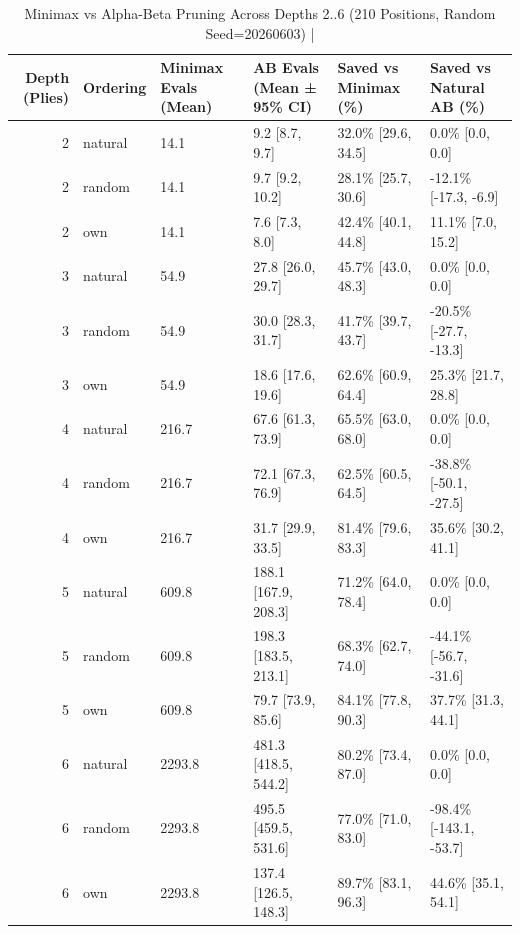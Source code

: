 \begin{table}[htbp]
\centering
\caption{Minimax vs Alpha-Beta Pruning Across Depths 2..6 (210 Positions, Random Seed=20260603) | \stampline}
\label{tab:partC_pruning}
\begin{tabular}{rlllll}
\toprule
Depth (Plies) & Ordering & Minimax Evals (Mean) & AB Evals (Mean ± 95\% CI) & Saved vs Minimax (\%) & Saved vs Natural AB (\%) \\
\midrule
2 & natural & 14.1 & 9.2 [8.7, 9.7] & 32.0\% [29.6, 34.5] & 0.0\% [0.0, 0.0] \\
2 & random & 14.1 & 9.7 [9.2, 10.2] & 28.1\% [25.7, 30.6] & -12.1\% [-17.3, -6.9] \\
2 & own & 14.1 & 7.6 [7.3, 8.0] & 42.4\% [40.1, 44.8] & 11.1\% [7.0, 15.2] \\
3 & natural & 54.9 & 27.8 [26.0, 29.7] & 45.7\% [43.0, 48.3] & 0.0\% [0.0, 0.0] \\
3 & random & 54.9 & 30.0 [28.3, 31.7] & 41.7\% [39.7, 43.7] & -20.5\% [-27.7, -13.3] \\
3 & own & 54.9 & 18.6 [17.6, 19.6] & 62.6\% [60.9, 64.4] & 25.3\% [21.7, 28.8] \\
4 & natural & 216.7 & 67.6 [61.3, 73.9] & 65.5\% [63.0, 68.0] & 0.0\% [0.0, 0.0] \\
4 & random & 216.7 & 72.1 [67.3, 76.9] & 62.5\% [60.5, 64.5] & -38.8\% [-50.1, -27.5] \\
4 & own & 216.7 & 31.7 [29.9, 33.5] & 81.4\% [79.6, 83.3] & 35.6\% [30.2, 41.1] \\
5 & natural & 609.8 & 188.1 [167.9, 208.3] & 71.2\% [64.0, 78.4] & 0.0\% [0.0, 0.0] \\
5 & random & 609.8 & 198.3 [183.5, 213.1] & 68.3\% [62.7, 74.0] & -44.1\% [-56.7, -31.6] \\
5 & own & 609.8 & 79.7 [73.9, 85.6] & 84.1\% [77.8, 90.3] & 37.7\% [31.3, 44.1] \\
6 & natural & 2293.8 & 481.3 [418.5, 544.2] & 80.2\% [73.4, 87.0] & 0.0\% [0.0, 0.0] \\
6 & random & 2293.8 & 495.5 [459.5, 531.6] & 77.0\% [71.0, 83.0] & -98.4\% [-143.1, -53.7] \\
6 & own & 2293.8 & 137.4 [126.5, 148.3] & 89.7\% [83.1, 96.3] & 44.6\% [35.1, 54.1] \\
\bottomrule
\end{tabular}

\end{table}
